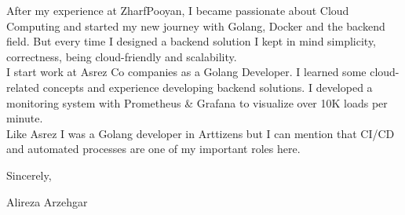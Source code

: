 \documentclass{coverletter}
\begin{document}
After my experience at ZharfPooyan, I became passionate about Cloud Computing and started my new journey
with Golang, Docker and the backend field. But every time I designed a backend solution
I kept in mind simplicity, correctness, being cloud-friendly and scalability.
\\

I start work at Asrez Co companies as a Golang Developer. I learned some cloud-related
concepts and experience developing backend solutions. I developed a monitoring system with
Prometheus \& Grafana to visualize over 10K loads per minute.
\\

Like Asrez I was a Golang developer in Arttizens but I can mention that CI/CD and automated processes are one of my
important roles here.

\vspace{0.6 cm}
\setlength{\parindent}{0pt}

Sincerely,

Alireza Arzehgar
\end{document}
